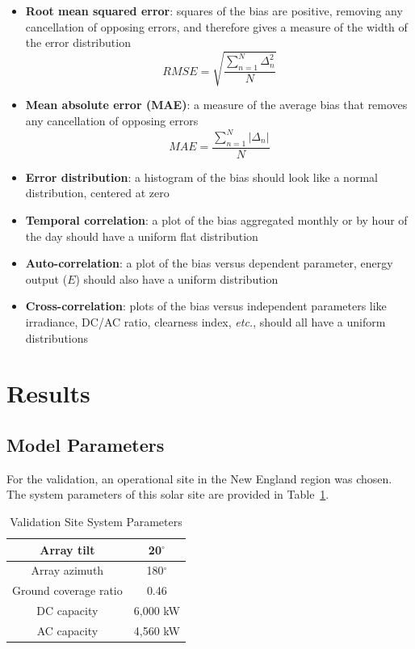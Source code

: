 \documentclass[conference]{IEEEtran}
\begin{document}
\begin{itemize}
\item \textbf{Root mean squared error}: squares of the bias are positive, removing any cancellation of opposing errors, and therefore gives a measure of the width of the error distribution
\begin{equation}
\mathit{RMSE}=\sqrt{\frac{\sum_{n=1}^N{\Delta_n^2}}{N}}\label{eq:rmse}
\end{equation}
\item \textbf{Mean absolute error (MAE)}: a measure of the average bias that removes any cancellation of opposing errors
\begin{equation}
\mathit{MAE}=\frac{\sum_{n=1}^N{\left|\Delta_n\right|}}{N}\label{eq:mae}
\end{equation}
\item \textbf{Error distribution}: a histogram of the bias should look like a normal distribution, centered at zero
\item \textbf{Temporal correlation}: a plot of the bias aggregated monthly or by hour of the day should have a uniform flat distribution
\item \textbf{Auto-correlation}: a plot of the bias versus dependent parameter, energy output ($E$) should also have a uniform distribution
\item \textbf{Cross-correlation}: plots of the bias versus independent parameters like irradiance, DC/AC ratio, clearness index, \textit{etc.}, should all have a uniform distributions
\end{itemize}


\section{Results}

\subsection{Model Parameters}

For the validation, an operational site in the New England region was chosen. The system parameters of this solar site are provided in Table~\ref{table1}.

\begin{table}[htbp]
\caption{Validation Site System Parameters}
\begin{center}
\begin{tabular}{ |c|c| } 
\hline
Array tilt & 20$^{\circ}$ \\
\hline
Array azimuth & 180$^{\circ}$ \\
\hline
Ground coverage ratio & 0.46 \\
\hline
DC capacity & 6,000 kW \\
\hline
AC capacity & 4,560 kW \\
\hline
\end{tabular}
\end{center}
\label{table1}
\end{table}
\end{document}
